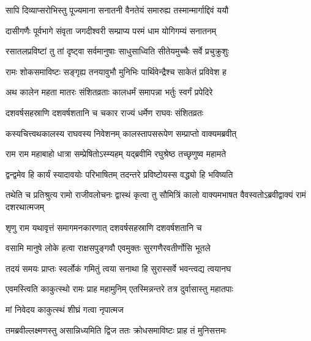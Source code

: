 \twolineshloka
{सापि दिव्याप्सरोभिस्तु पूज्यमाना सनातनी}
{वैनतेयं समारुह्य तस्मान्मार्गाद्दिवं ययौ}%

\twolineshloka
{दासीगणैः पूर्वभागे संवृता जगदीश्वरी}
{सम्प्राप्य परमं धाम योगिगम्यं सनातनम्}%

\twolineshloka
{रसातलप्रविष्टां तु तां दृष्ट्वा सर्वमानुषाः}
{साधुसाध्विति सीतेयमुच्चैः सर्वे प्रचुक्रुशुः}%

\twolineshloka
{रामः शोकसमाविष्टः सङ्गृह्य तनयावुभौ}
{मुनिभिः पार्थिवेन्द्रैश्च साकेतं प्रविवेश ह}%

\twolineshloka
{अथ कालेन महता मातरः संशितव्रताः}
{कालधर्मं समापन्ना भर्तुः स्वर्गं प्रपेदिरे}%

\twolineshloka
{दशवर्षसहस्राणि दशवर्षशतानि च}
{चकार राज्यं धर्मेण राघवः संशितव्रतः}%

\twolineshloka
{कस्यचित्त्वथकालस्य राघवस्य निवेशनम्}
{कालस्तापसरूपेण सम्प्राप्तो वाक्यमब्रवीत्}%


\twolineshloka
{राम राम महाबाहो धात्रा सम्प्रेषितोऽस्म्यहम्}
{यद्ब्रवीमि रघुश्रेष्ठ तच्छृणुष्व महामते}%

\twolineshloka
{द्वन्द्वमेव हि कार्यं स्यादावयोः परिभाषितम्}
{तदन्तरे प्रविष्टोयस्स वद्ध्यो हि भविष्यति}%



\threelineshloka
{तथेति च प्रतिश्रुत्य रामो राजीवलोचनः}
{द्वास्थं कृत्वा तु सौमित्रिं कालो वाक्यमभाषत}
{वैवस्वतोऽब्रवीद्वाक्यं रामं दशरथात्मजम्}%


\twolineshloka
{शृणु राम यथावृत्तं समागमनकारणात्}
{दशवर्षसहस्राणि दशवर्षशतानि च}%

\twolineshloka
{वसामि मानुषे लोके हत्वा राक्षसपुङ्गवौ}
{एवमुक्तः सुरगणैरवतीर्णोसि भूतले}%

\twolineshloka
{तदयं समयः प्राप्तः स्वर्लोकं गमितुं त्वया}
{सनाथा हि सुरास्सर्वे भवन्त्वद्य त्वयानघ}%


\twolineshloka
{एवमस्त्विति काकुत्स्थो रामः प्राह महामुनिम्}
{एतस्मिन्नन्तरे तत्र दुर्वासास्तु महातपाः}%


\onelineshloka
{मां निवेदय काकुत्स्थं शीघ्रं गत्वा नृपात्मज}%


\twolineshloka
{तमब्रवील्लक्ष्मणस्तु असान्निध्यमिति द्विज}
{ततः क्रोधसमाविष्टः प्राह तं मुनिसत्तमः}%

